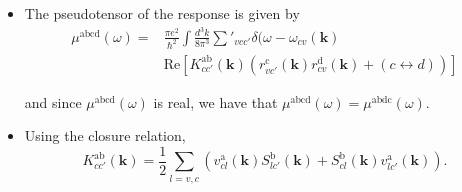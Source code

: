\documentclass{beamer}
\begin{document}
\begin{frame}

{\small


\begin{itemize}

\item 
The pseudotensor of the response is given by
\begin{equation}\label{eq:mu}
\begin{aligned}
\mu^{\mathrm{abcd}}  (\omega) 
=&
\frac{\pi e^{2}}{\hbar^{2}} \int 
\frac{d^{3}k}{8 \pi^{3}} \sum'_{vcc'}
\delta(\omega-\omega_{cv}({\mathbf k})  \\
&\mathrm{Re} \left[ K^{\mathrm{ab}}_{cc'}({\mathbf k}) 
\left(  
r^{\mathrm{c}}_{vc'}({\mathbf k})   
r^{\mathrm{d}}_{cv }({\mathbf k})  +
(c \leftrightarrow d)  
\right) 
\right]
\end{aligned}
\end{equation} 

and since $\mu^{\mathrm{abcd}}(\omega)$ is
real, we have that $\mu^{\mathrm{abcd}}(\omega) =
\mu^{\mathrm{abdc}} (\omega)$. 

\item 
Using the closure relation,
\begin{equation}
K^{\mathrm{ab}}_{cc'}({\mathbf k}) = \frac{1}{2}
\sum_{l=v,c}
\left(v^{\mathrm{a}}_{cl}({\mathbf k})S^{\mathrm{b}}_{lc'}({\mathbf k})
+S^{\mathrm{b}}_{cl}({\mathbf k}) v^{\mathrm{a}}_{lc'}({\mathbf k})
\right)
.
\label{eq:velspimatelem}
\end{equation}

\end{itemize}
}
\end{frame}


\end{document}
